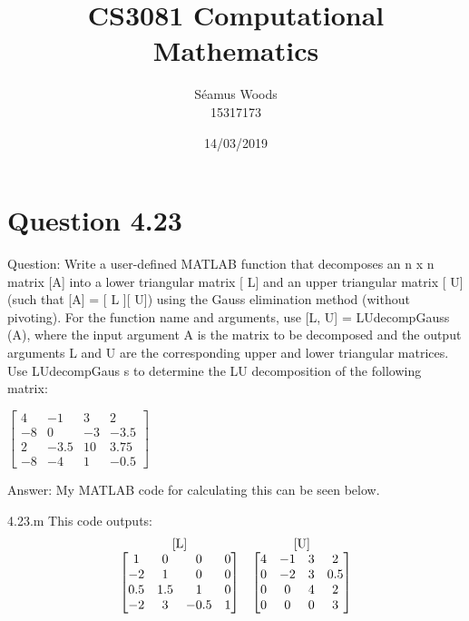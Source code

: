 \documentclass[12pt]{report}
\title{CS3081 Computational Mathematics}
\author{Séamus Woods \\ 15317173}
\date{14/03/2019}
\begin{document}
\maketitle
\newpage

\section{Question 4.23}
Question: Write a user-defined MATLAB function that decomposes an n  x  n matrix [A] into a lower triangular matrix [ L] and  an  upper triangular matrix [ U] (such that [A] = [ L ][  U]) using the  Gauss elimination method (without pivoting). For the  function name and arguments, use [L, U]  = LUdecompGauss (A), where the input argument A is the matrix to be decomposed and the output arguments L and U are the cor­responding upper and lower triangular matrices. Use LUdecompGaus s to determine the LU decomposi­tion of the following matrix:  
\begin{center}
$\begin{bmatrix}
{4} & {-1} & {3} & {2}\\
{-8} & {0} & {-3} & {-3.5}\\
{2} & {-3.5} & {10} & {3.75}\\
{-8} & {-4} & {1} & {-0.5}
\end{bmatrix}$
\end{center}
\quad
\newline
\newline
Answer: My MATLAB code for calculating this can be seen below.

{4.23.m}
\quad
\newline
This code outputs:
\[
\stackrel{\mbox{[L]}}{%
\begin{bmatrix}
{1} & {0} & {0} & {0} \\
{-2} & {1} & {0} & {0} \\
{0.5} & {1.5} & {1} & {0} \\
{-2} & {3} & {-0.5} & {1} 
\end{bmatrix}%
}
\quad
\stackrel{\mbox{[U]}}{%
\begin{bmatrix}
{4} & {-1} & {3} & {2} \\
{0} & {-2} & {3} & {0.5} \\
{0} & {0} & {4} & {2} \\
{0} & {0} & {0} & {3} 
\end{bmatrix}%
}
\]
\newpage
\end{document}
